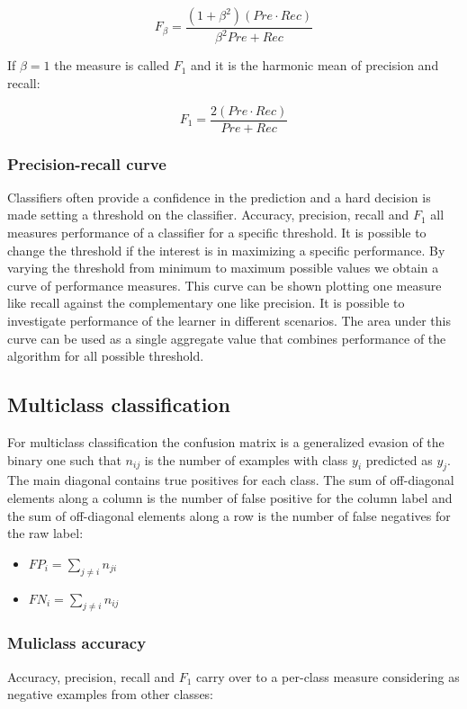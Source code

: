 		$$F_\beta = \frac{(1+\beta^2)(Pre\cdot Rec)}{\beta^2Pre + Rec}$$

		If $\beta = 1$ the measure is called $F_1$ and it is the harmonic mean of precision and recall:

		$$F_1 = \frac{2(Pre\cdot Rec)}{Pre+Rec}$$

		\subsubsection{Precision-recall curve}
		Classifiers often provide a confidence in the prediction and a hard decision is made setting a threshold on the classifier.
		Accuracy, precision, recall and $F_1$ all measures performance of a classifier for a specific threshold.
		It is possible to change the threshold if the interest is in maximizing a specific performance.
		By varying the threshold from minimum to maximum possible values we obtain a curve of performance measures.
		This curve can be shown plotting one measure like recall against the complementary one like precision.
		It is possible to investigate performance of the learner in different scenarios.
		The area under this curve can be used as a single aggregate value that combines performance of the algorithm for all possible threshold.

	\subsection{Multiclass classification}
	For multiclass classification the confusion matrix is a generalized evasion of the binary one such that $n_{ij}$ is the number of examples with class $y_i$ predicted as $y_j$.
	The main diagonal contains true positives for each class.
	The sum of off-diagonal elements along a column is the number of false positive for the column label and the sum of off-diagonal elements along a row is the number of false negatives for the raw label:

	\begin{multicols}{2}
		\begin{itemize}
			\item $FP_i = \sum\limits_{j\neq i} n_{ji}$
			\item $FN_i = \sum\limits_{j\neq i}n_{ij}$
		\end{itemize}
	\end{multicols}

		\subsubsection{Muliclass accuracy}
		Accuracy, precision, recall and $F_1$ carry over to a per-class measure considering as negative examples from other classes:

